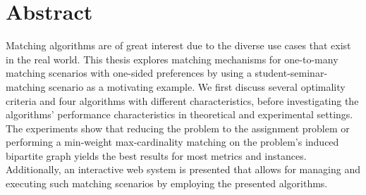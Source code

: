 \section*{Abstract}\label{sec:abstract}

Matching algorithms are of great interest due to the diverse use cases that exist in the real world. This thesis explores matching mechanisms for one-to-many matching scenarios with one-sided preferences by using a student-seminar-matching scenario as a motivating example. We first discuss several optimality criteria and four algorithms with different characteristics, before investigating the algorithms' performance characteristics in theoretical and experimental settings. The experiments show that reducing the problem to the assignment problem or performing a min-weight max-cardinality matching on the problem's induced bipartite graph yields the best results for most metrics and instances. Additionally, an interactive web system is presented that allows for managing and executing such matching scenarios by employing the presented algorithms. 